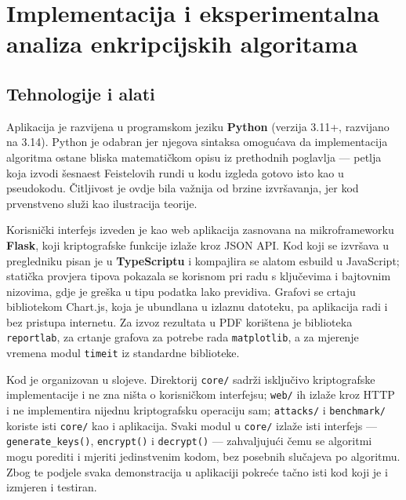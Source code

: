 %
%

\chapter{Implementacija i eksperimentalna analiza enkripcijskih algoritama}
\label{ch:implementacija}

\section{Tehnologije i alati}
\label{sec:tehnologije}

Aplikacija je razvijena u programskom jeziku \textbf{Python} (verzija 3.11+, razvijano na 3.14). Python je odabran jer njegova sintaksa omogućava da implementacija algoritma ostane bliska matematičkom opisu iz prethodnih poglavlja --- petlja koja izvodi šesnaest Feistelovih rundi u kodu izgleda gotovo isto kao u pseudokodu. Čitljivost je ovdje bila važnija od brzine izvršavanja, jer kod prvenstveno služi kao ilustracija teorije.

Korisnički interfejs izveden je kao web aplikacija zasnovana na mikroframeworku \textbf{Flask}, koji kriptografske funkcije izlaže kroz JSON API. Kod koji se izvršava u pregledniku pisan je u \textbf{TypeScriptu} i kompajlira se alatom esbuild u JavaScript; statička provjera tipova pokazala se korisnom pri radu s ključevima i bajtovnim nizovima, gdje je greška u tipu podatka lako previdiva. Grafovi se crtaju bibliotekom Chart.js, koja je ubundlana u izlaznu datoteku, pa aplikacija radi i bez pristupa internetu. Za izvoz rezultata u PDF korištena je biblioteka \texttt{reportlab}, za crtanje grafova za potrebe rada \texttt{matplotlib}, a za mjerenje vremena modul \texttt{timeit} iz standardne biblioteke.

Kod je organizovan u slojeve. Direktorij \texttt{core/} sadrži isključivo kriptografske implementacije i ne zna ništa o korisničkom interfejsu; \texttt{web/} ih izlaže kroz HTTP i ne implementira nijednu kriptografsku operaciju sam; \texttt{attacks/} i \texttt{benchmark/} koriste isti \texttt{core/} kao i aplikacija. Svaki modul u \texttt{core/} izlaže isti interfejs --- \texttt{generate\_keys()}, \texttt{encrypt()} i \texttt{decrypt()} --- zahvaljujući čemu se algoritmi mogu porediti i mjeriti jedinstvenim kodom, bez posebnih slučajeva po algoritmu. Zbog te podjele svaka demonstracija u aplikaciji pokreće tačno isti kod koji je i izmjeren i testiran.

